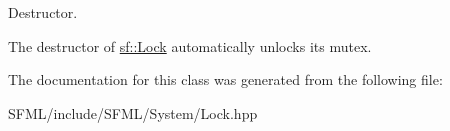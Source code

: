 Destructor. 

The destructor of \mbox{\hyperlink{classsf_1_1_lock}{sf\+::\+Lock}} automatically unlocks its mutex. \begin{DoxyVerb}\end{DoxyVerb}
 

The documentation for this class was generated from the following file\+:\begin{DoxyCompactItemize}
\item 
S\+F\+M\+L/include/\+S\+F\+M\+L/\+System/Lock.\+hpp\end{DoxyCompactItemize}
